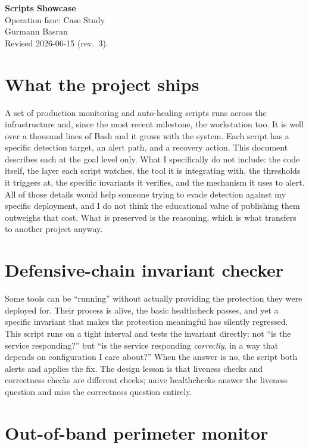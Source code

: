 \documentclass[12pt]{article}
\begin{document}
\begin{center}
{\LARGE\textbf{Scripts Showcase}}\\[4pt]
{\large Operation fsoc: Case Study}\\[6pt]
Gurmann Basran\\
\small Revised 2026-06-15 (rev.\ 3).
\end{center}

\section{What the project ships}

A set of production monitoring and auto-healing scripts runs across the infrastructure and, since the most recent milestone, the workstation too. It is well over a thousand lines of Bash and it grows with the system. Each script has a specific detection target, an alert path, and a recovery action. This document describes each at the goal level only. What I specifically do not include: the code itself, the layer each script watches, the tool it is integrating with, the thresholds it triggers at, the specific invariants it verifies, and the mechanism it uses to alert. All of those details would help someone trying to evade detection against my specific deployment, and I do not think the educational value of publishing them outweighs that cost. What is preserved is the reasoning, which is what transfers to another project anyway.

\section{Defensive-chain invariant checker}

Some tools can be ``running'' without actually providing the protection they were deployed for. Their process is alive, the basic healthcheck passes, and yet a specific invariant that makes the protection meaningful has silently regressed. This script runs on a tight interval and tests the invariant directly: not ``is the service responding?'' but ``is the service responding \emph{correctly}, in a way that depends on configuration I care about?'' When the answer is no, the script both alerts and applies the fix. The design lesson is that liveness checks and correctness checks are different checks; naive healthchecks answer the liveness question and miss the correctness question entirely.

\section{Out-of-band perimeter monitor}
\end{document}
